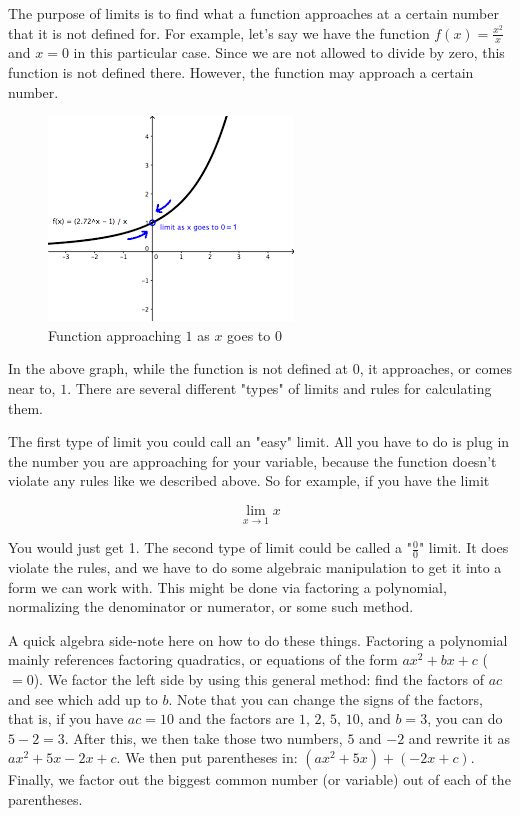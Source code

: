 The purpose of limits is to find what a function approaches at a certain number that it is not defined for. 
For example, let's say we have the function $f(x) = \frac{x^2}{x}$ and $x = 0$ in this particular case. 
Since we are not allowed to divide by zero, this function is not defined there. 
However, the function may approach a certain number.

\begin{figure}[H]
\caption{Function approaching $1$ as $x$ goes to $0$}
\includegraphics[scale=0.8]{images.png}
\end{figure}

In the above graph, while the function is not defined at $0$, it approaches, or comes near to, $1$. 
There are several different "types" of limits and rules for calculating them. 

The first type of limit you could call an "easy" limit. 
All you have to do is plug in the number you are approaching for your variable, because the function doesn't violate any rules like we described above. 
So for example, if you have the limit

\begin{equation*}
    \lim\limits_{x\rightarrow 1} x
\end{equation*}

You would just get 1. 
The second type of limit could be called a "$\frac{0}{0}$" limit. 
It does violate the rules, and we have to do some algebraic manipulation to get it into a form we can work with. 
This might be done via factoring a polynomial, normalizing the denominator or numerator, or some such method.

A quick algebra side-note here on how to do these things. 
Factoring a polynomial mainly references factoring quadratics, or equations of the form $ax^2 + bx + c$ ($=0$). 
We factor the left side by using this general method: find the factors of $ac$ and see which add up to $b$. 
Note that you can change the signs of the factors, that is, if you have $ac = 10$ and the factors are $1, \, 2, \, 5, \, 10$, and $b = 3$, you can do $5-2 = 3$. 
After this, we then take those two numbers, $5$ and $-2$ and rewrite it as $ax^2 + 5x -2x + c$. 
We then put parentheses in: $(ax^2 + 5x) + (-2x + c)$. 
Finally, we factor out the biggest common number (or variable) out of each of the parentheses.

